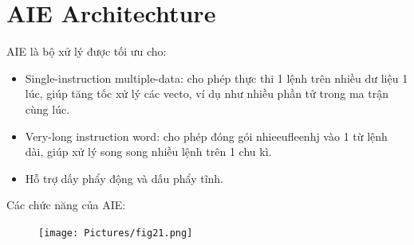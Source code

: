 \section{AIE Architechture}


AIE là bộ xử lý được tối ưu cho:
\begin{itemize}
    \item Single-instruction multiple-data: cho phép thực thi 1 lệnh trên nhiều dư liệu 1 lúc, giúp tăng tốc xử lý các vecto, ví dụ như nhiều phần tử trong ma trận cùng lúc.
    \item Very-long instruction word: cho phép đóng gói nhieeufleenhj vào 1 từ lệnh dài, giúp xử lý song song nhiều lệnh trên 1 chu kì.
    \item Hỗ trợ dấy phẩy động và dấu phẩy tĩnh.
\end{itemize}
Các chức năng của AIE: 
\begin{figure}[H]
    \centering
    \texttt{[image: Pictures/fig21.png]}
  
    \label{fig:enter-label}
\end{figure}
